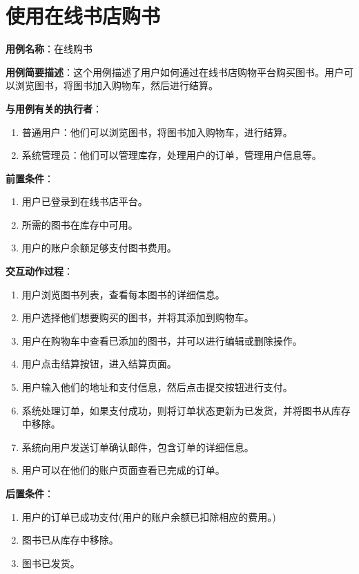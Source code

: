 \documentclass[11pt, a4paper, oneside]{ctexbook}
\begin{document}
\section{使用在线书店购书}
\textbf{用例名称}：在线购书

\textbf{用例简要描述}：这个用例描述了用户如何通过在线书店购物平台购买图书。用户可以浏览图书，将图书加入购物车，然后进行结算。

\textbf{与用例有关的执行者}：
\begin{enumerate}
    \item 普通用户：他们可以浏览图书，将图书加入购物车，进行结算。
    \item 系统管理员：他们可以管理库存，处理用户的订单，管理用户信息等。
\end{enumerate}

\textbf{前置条件}：
\begin{enumerate}
    \item 用户已登录到在线书店平台。
    \item 所需的图书在库存中可用。
    \item 用户的账户余额足够支付图书费用。
\end{enumerate}

\textbf{交互动作过程}：
\begin{enumerate}
    \item 用户浏览图书列表，查看每本图书的详细信息。
    \item 用户选择他们想要购买的图书，并将其添加到购物车。
    \item 用户在购物车中查看已添加的图书，并可以进行编辑或删除操作。
    \item 用户点击结算按钮，进入结算页面。
    \item 用户输入他们的地址和支付信息，然后点击提交按钮进行支付。
    \item 系统处理订单，如果支付成功，则将订单状态更新为已发货，并将图书从库存中移除。
    \item 系统向用户发送订单确认邮件，包含订单的详细信息。
    \item 用户可以在他们的账户页面查看已完成的订单。
\end{enumerate}

\textbf{后置条件}：
\begin{enumerate}
    \item 用户的订单已成功支付(用户的账户余额已扣除相应的费用。)
    \item 图书已从库存中移除。
    \item 图书已发货。
\end{enumerate}
\end{document}
